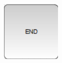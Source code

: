 \documentclass[12pt]{mwart}
\begin{document}
\begin{center}
\begin{minipage}{0.15\linewidth}
	\end{minipage}
	\hfill
	\begin{minipage}{0.14\linewidth}
		\includegraphics[width=\linewidth]{ENDBLK.png}
	\end{minipage}
	
	 \label{bloki}
	
	\end{center} 
	
\end{document}
